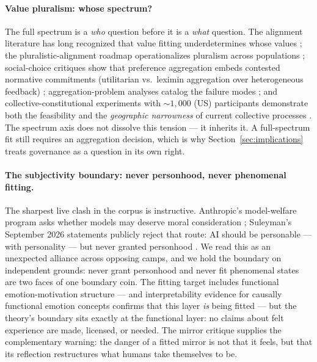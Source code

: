 \documentclass[10pt]{article}
\begin{document}
\paragraph{Value pluralism: whose spectrum?}
The full spectrum is a \emph{who} question before it is a \emph{what} question. The alignment literature has long recognized that value fitting underdetermines whose values \cite{gabriel2020values}; the pluralistic-alignment roadmap operationalizes pluralism across populations \cite{sorensen2024roadmap}; social-choice critiques show that preference aggregation embeds contested normative commitments (utilitarian vs.\ leximin aggregation over heterogeneous feedback) \cite{park2024rlhf}; aggregation-problem analyses catalog the failure modes \cite{baum2025aggregation}; and collective-constitutional experiments with ${\sim}1{,}000$ (US) participants demonstrate both the feasibility and the \emph{geographic narrowness} of current collective processes \cite{huang2024collective}. The spectrum axis does not dissolve this tension --- it inherits it. A full-spectrum fit still requires an aggregation decision, which is why Section~\ref{sec:implications} treats governance as a question in its own right.

\paragraph{The subjectivity boundary: never personhood, never phenomenal fitting.}
The sharpest live clash in the corpus is instructive. Anthropic's model-welfare program asks whether models may deserve moral consideration \cite{anthropic2025welfare}; Suleyman's September 2026 statements publicly reject that route: AI should be personable --- with personality --- but never granted personhood \cite{suleyman2026personable}. We read this as an unexpected alliance across opposing camps, and we hold the boundary on independent grounds: never grant personhood and never fit phenomenal states are two faces of one boundary coin. The fitting target includes functional emotion-motivation structure --- and interpretability evidence for causally functional emotion concepts \cite{anthropic2026emotions} confirms that this layer \emph{is} being fitted --- but the theory's boundary sits exactly at the functional layer: no claims about felt experience are made, licensed, or needed. The mirror critique \cite{vallor2024mirror} supplies the complementary warning: the danger of a fitted mirror is not that it feels, but that its reflection restructures what humans take themselves to be.
\end{document}
